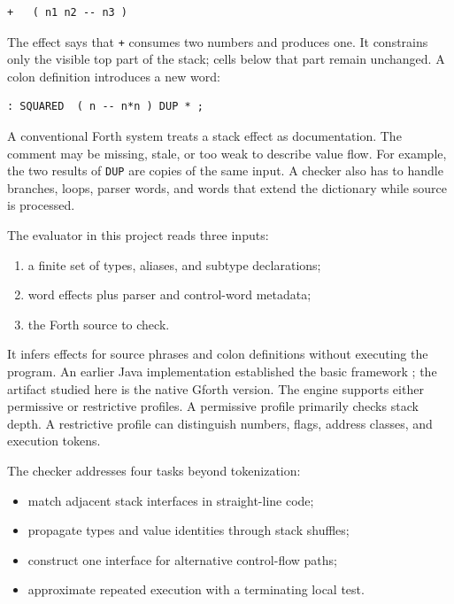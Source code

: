 \documentclass[11pt,a4paper]{article}
\begin{document}
\begin{lstlisting}
+   ( n1 n2 -- n3 )
\end{lstlisting}

The effect says that \texttt{+} consumes two numbers and produces one.  It
constrains only the visible top part of the stack; cells below that part remain
unchanged.  A colon definition introduces a new word:

\begin{lstlisting}
: SQUARED  ( n -- n*n ) DUP * ;
\end{lstlisting}

A conventional Forth system treats a stack effect as documentation.  The
comment may be missing, stale, or too weak to describe value flow.  For
example, the two results of \texttt{DUP} are copies of the same input.  A
checker also has to handle branches, loops, parser words, and words that extend
the dictionary while source is processed.

The evaluator in this project reads three inputs:

\begin{enumerate}
  \item a finite set of types, aliases, and subtype declarations;
  \item word effects plus parser and control-word metadata;
  \item the Forth source to check.
\end{enumerate}

It infers effects for source phrases and colon definitions without executing
the program.  An earlier Java implementation established the basic framework
\cite{poial2008}; the artifact studied here is the native Gforth version.  The
engine supports either permissive or restrictive profiles.  A permissive
profile primarily checks stack depth.  A restrictive profile can distinguish
numbers, flags, address classes, and execution tokens.

The checker addresses four tasks beyond tokenization:

\begin{itemize}
  \item match adjacent stack interfaces in straight-line code;
  \item propagate types and value identities through stack shuffles;
  \item construct one interface for alternative control-flow paths;
  \item approximate repeated execution with a terminating local test.
\end{itemize}
\end{document}
